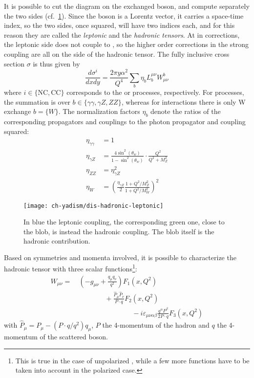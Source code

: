It is possible to cut the \dis diagram on the exchanged boson, and compute
separately the two sides (cf.\ \cref{fig:dis/dis-lept-hadr}).
Since the boson is a Lorentz vector, it carries a space-time index, so the two
sides, once squared, will have two indices each, and for this reason they are
called the \textit{leptonic} and the \textit{hadronic tensors}.
%
At \lo in \ew corrections, the leptonic side does not couple to \qcd, so the
higher order corrections in the strong coupling are all on the side of the
hadronic tensor.
%
The fully inclusive \dis cross section $\sigma$ is thus given by
\begin{equation}
    \frac{d\sigma^i}{dx dy} = \frac{2\pi y \alpha^2}{Q^4} \sum_b \eta_b L^{\mu\nu}_b W_{\mu\nu}^b
\end{equation}
where $i \in \{\text{NC}, \text{CC}\}$ corresponds to the \nc or \cc processes,
respectively.
For \nc processes, the summation is over $b \in \{\gamma\gamma,\gamma Z,ZZ\}$,
whereas for \cc interactions there is only W exchange $b=\{W\}$.
The normalization factors $\eta_b$ denote the ratios of the corresponding
propagators and couplings to the photon propagator and coupling squared:
\begin{align}
    \eta_{\gamma\gamma} &= 1\\
    \eta_{\gamma Z} &= \frac{4\sin^2(\theta_w)}{1 - \sin^2(\theta_w)} \cdot \frac{Q^2}{Q^2 + M_Z^2}\\
    \eta_{ZZ} &= \eta_{\gamma Z}^2\\
    \eta_W &= \left(\frac{\eta_{\gamma Z}}{2} \frac{1 + Q^2/M_Z^2}{1 + Q^2/M_W^2}\right)^2
  \label{eq:dis/prop-corr}
\end{align}

\begin{figure}
	\centering
	\texttt{[image: ch-yadism/dis-hadronic-leptonic]}
	\caption{
    In blue the leptonic coupling, the corresponding green one, close to the
    blob, is instead the hadronic coupling. The blob itself is the hadronic
    contribution.
  }
	\label{fig:dis/dis-lept-hadr}
\end{figure}

Based on symmetries and momenta involved, it is possible to characterize the
hadronic tensor with three scalar functions\footnote{
  This is true in the case of unpolarized \dis, while a few more functions have
  to be taken into account in the polarized case.
}:
\begin{align}
  W_{\mu\nu} =&~ \left(-g_{\mu\nu} + \frac{q_\mu q_\nu}{q^2}\right) F_1(x,Q^2)\nonumber\\
          &\qquad\qquad + \frac{\hat P_\mu \hat P_\nu}{P \cdot q} F_2(x,Q^2)\nonumber\\
          &\qquad\qquad\qquad\qquad - i \varepsilon_{\mu\nu\alpha\beta}
          \frac{q^\alpha P^\beta}{2 P\cdot q} F_3(x,Q^2)
  \label{eq:dis/hadr-tens}
\end{align}
with $\hat P_\mu = P_\mu - (P\cdot q / q^2) q_\mu$, $P$ the 4-momentum of the
hadron and $q$ the 4-momentum of the scattered boson.

